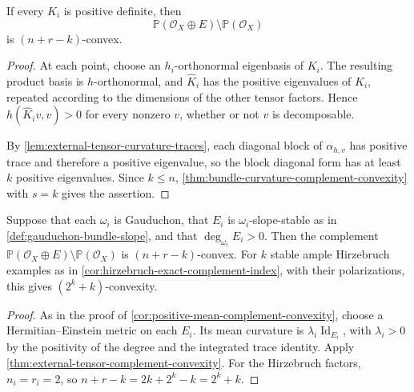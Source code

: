 \begin{theorem}\label{thm:external-tensor-complement-convexity}
If every $K_i$ is positive definite, then
\[
 \mathbb P(\mathcal O_X\oplus E)\setminus\mathbb P(\mathcal O_X)
\]
is $(n+r-k)$-convex.
\end{theorem}
\begin{proof}
At each point, choose an $h_i$-orthonormal eigenbasis of $K_i$. The resulting product basis is $h$-orthonormal, and $\widehat K_i$ has the positive eigenvalues of $K_i$, repeated according to the dimensions of the other tensor factors. Hence $h(\widehat K_i v,v)>0$ for every nonzero $v$, whether or not $v$ is decomposable.

By \cref{lem:external-tensor-curvature-traces}, each diagonal block of $\alpha_{h,v}$ has positive trace and therefore a positive eigenvalue, so the block diagonal form has at least $k$ positive eigenvalues. Since $k\leq n$, \cref{thm:bundle-curvature-complement-convexity} with $s=k$ gives the assertion.
\end{proof}

\begin{corollary}\label{cor:stable-factor-complement-convexity}
Suppose that each $\omega_i$ is Gauduchon, that $E_i$ is $\omega_i$-slope-stable as in \cref{def:gauduchon-bundle-slope}, and that $\deg_{\omega_i}E_i>0$. Then the complement $\mathbb P(\mathcal O_X\oplus E)\setminus\mathbb P(\mathcal O_X)$ is $(n+r-k)$-convex. For $k$ stable ample Hirzebruch examples as in \cref{cor:hirzebruch-exact-complement-index}, with their polarizations, this gives $(2^k+k)$-convexity.
\end{corollary}
\begin{proof}
As in the proof of \cref{cor:positive-mean-complement-convexity}, choose a Hermitian--Einstein metric on each $E_i$. Its mean curvature is $\lambda_i\operatorname{Id}_{E_i}$, with $\lambda_i>0$ by the positivity of the degree and the integrated trace identity. Apply \cref{thm:external-tensor-complement-convexity}. For the Hirzebruch factors, $n_i=r_i=2$, so $n+r-k=2k+2^k-k=2^k+k$.
\end{proof}
